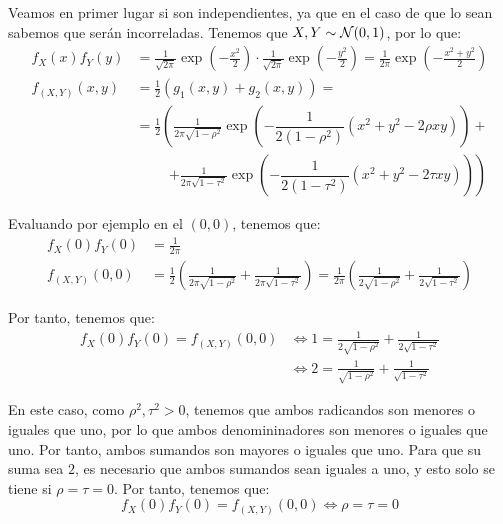 \begin{ejercicio}
\begin{enumerate}
        Veamos en primer lugar si son independientes, ya que en el caso de que lo sean sabemos que serán incorreladas.
        Tenemos que $X,Y\sim \mathcal{N}(0,1)$, por lo que:
        \begin{align*}
            f_X(x)f_Y(y) &= \frac{1}{\sqrt{2\pi}}\exp\left(-\frac{x^2}{2}\right)\cdot \frac{1}{\sqrt{2\pi}}\exp\left(-\frac{y^2}{2}\right) = \frac{1}{2\pi}\exp\left(-\frac{x^2+y^2}{2}\right)\\
            f_{(X,Y)}(x,y) &= \frac{1}{2}\left(g_1(x,y)+g_2(x,y)\right)
            =\\&= \frac{1}{2}\left(\frac{1}{2\pi\sqrt{1-\rho^2}}\exp\left(-\dfrac{1}{2(1-\rho^2)}(x^2 +y^2 -2\rho xy)\right)+\right.\\&\hspace{1cm}\left.+\frac{1}{2\pi\sqrt{1-\tau^2}}\exp\left(-\dfrac{1}{2(1-\tau^2)}(x^2 +y^2 -2\tau xy)\right)\right)
        \end{align*}

        Evaluando por ejemplo en el $(0,0)$, tenemos que:
        \begin{align*}
            f_X(0)f_Y(0) &= \frac{1}{2\pi}\\
            f_{(X,Y)}(0,0) &= \frac{1}{2}\left(\frac{1}{2\pi\sqrt{1-\rho^2}}+\frac{1}{2\pi\sqrt{1-\tau^2}}\right)
            = \frac{1}{2\pi}\left(\frac{1}{2\sqrt{1-\rho^2}}+\frac{1}{2\sqrt{1-\tau^2}}\right)
        \end{align*}

        Por tanto, tenemos que:
        \begin{align*}
            f_X(0)f_Y(0) = f_{(X,Y)}(0,0) &\Longleftrightarrow
            1 = \frac{1}{2\sqrt{1-\rho^2}}+\frac{1}{2\sqrt{1-\tau^2}}\\
            & \Longleftrightarrow 2 = \frac{1}{\sqrt{1-\rho^2}}+\frac{1}{\sqrt{1-\tau^2}}
        \end{align*}

        En este caso, como $\rho^2,\tau^2>0$, tenemos que ambos radicandos son menores o iguales que uno, por lo que ambos denomininadores son menores o iguales que uno. Por tanto, ambos sumandos son mayores o iguales que uno.
        Para que su suma sea $2$, es necesario que ambos sumandos sean iguales a uno, y esto solo se tiene si $\rho=\tau=0$. Por tanto, tenemos que:
        \begin{equation*}
            f_X(0)f_Y(0) = f_{(X,Y)}(0,0) \Longleftrightarrow \rho=\tau=0
        \end{equation*}


\end{enumerate}
\end{ejercicio}
